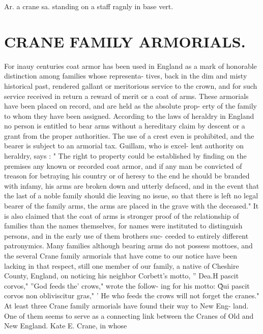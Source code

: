 Ar. a crane sa. standing on 
a staff ragnly in base vert. 



\chapter{CRANE FAMILY ARMORIALS.}


For inauy centuries coat armor has been used in England as a 
mark of honorable distinction among families whose representa- 
tives, back in the dim and misty historical past, rendered gallant 
or meritorious service to the crown, and for such service received 
in return a reward of merit or a coat of arms. These armorials 
have been placed on record, and are held as the absolute prop- 
erty of the family to whom they have been assigned. According 
to the laws of heraldry in England no person is entitled to bear 
arms without a hereditary claim by descent or a grant from the 
proper authorities. The use of a crest even is prohibited, and 
the bearer is subject to an armorial tax. Guillam, who is excel- 
lent authority on heraldry, says : " The right to property could be 
established by finding on the premises any known or recorded 
coat armor, and if any man be convicted of treason for betraying 
his country or of heresy to the end he should be branded with 
infamy, his arms are broken down and utterly defaced, and in 
the event that the last of a noble family should die leaving no 
issue, so that there is left no legal bearer of the family arms, the 
arms are placed in the grave with the deceased." It is also 
claimed that the coat of arms is stronger proof of the relationship 
of families than the names themselves, for names were instituted 
to distinguish persons, and in the early use of them brothers suc- 
ceeded to entirely different patronymics. Many families although 
bearing arms do not possess mottoes, and the several Crane family 
armorials that have come to our notice have been lacking in that 
respect, still one member of our family, a native of Cheshire 
County, England, on noticing his neighbor Corbett's motto, 
'' Dea.H pascit corvos," ''God feeds the' crows," wrote the follow- 
ing for his motto: \^\^ Qui pascit corvos non obliviscitur gras," 
' He who feeds the crows will not forget the cranes." At least 
three Crane family armorials have found their way to New Eng- 
land. One of them seems to serve as a connecting link between 
the Cranes of Old and New England. Kate E. Crane, in whose 



